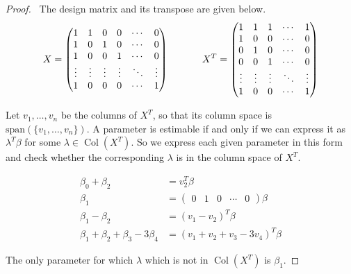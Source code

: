 \documentclass[12pt]{article}
\DeclareMathOperator*{\Col}{Col}
\begin{document}
\begin{enumerate}[leftmargin=0cm,itemindent=.5cm,labelwidth=\itemindent,labelsep=0cm,align=left]
\begin{proof}
\ The design matrix and its transpose are given below. $$X =
\begin{pmatrix}
1 & 1 & 0 & 0 & \cdots & 0 \\
1 & 0 & 1 & 0 & \cdots & 0 \\
1 & 0 & 0 & 1 & \cdots & 0 \\
\vdots & \vdots & \vdots & \vdots & \ddots & \vdots \\
1 & 0 & 0 & 0 & \cdots & 1
\end{pmatrix} \hspace{1.2cm}
X^T =
\begin{pmatrix}
1 & 1 & 1 & \cdots & 1 \\
1 & 0 & 0 & \cdots & 0 \\
0 & 1 & 0 & \cdots & 0 \\
0 & 0 & 1 & \cdots & 0 \\
\vdots & \vdots & \vdots & \ddots & \vdots \\
1 & 0 & 0 & \cdots & 1
\end{pmatrix}
$$

\noindent Let $v_1, \dots , v_n$ be the columns of $X^T$, so that its column space is $\text{span}(\{ v_1, \dots , v_n \} )$.  A parameter is estimable if and only if we can express it as $\lambda^T \beta$ for some $\lambda \in \Col(X^T)$.  So we express each given parameter in this form and check whether the corresponding $\lambda$ is in the column space of $X^T$.

\begin{align*}
\beta_0 + \beta_2 &= v_2^T \beta \\
\beta_1 &= \begin{pmatrix}
0 & 1 & 0 & \cdots & 0
\end{pmatrix} \beta \\
\beta_1 - \beta_2 &= (v_1 - v_2)^T \beta \\
\beta_1 + \beta_2 + \beta_3 - 3\beta_4 &= (v_1 + v_2 + v_3 - 3v_4)^T \beta
\end{align*}

\noindent The only parameter for which $\lambda$ which is not in $\Col(X^T)$ is $\beta_1$.


\end{proof}
\end{enumerate}
\end{document}
